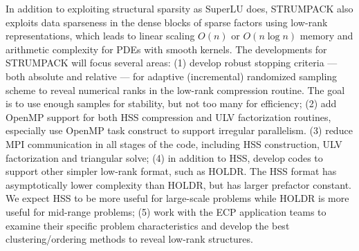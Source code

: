 In addition to exploiting structural sparsity as SuperLU does, STRUMPACK
also exploits data sparseness in the dense blocks of sparse factors using
low-rank representations, which leads to linear scaling $O(n)$ or $O(n \log n)$
memory and arithmetic complexity for PDEs with smooth kernels.
The developments for STRUMPACK will focus several areas:
(1) develop robust stopping criteria --- both absolute and relative --- for
    adaptive (incremental) randomized sampling scheme to reveal numerical
    ranks in the low-rank compression routine. The goal is to use
    enough samples for stability, but not too many for efficiency;
(2) add OpenMP support for both HSS compression and ULV factorization routines,
    especially use OpenMP task construct to support irregular parallelism.
(3) reduce MPI communication in all stages of the code, including HSS
    construction, ULV factorization and triangular solve;
(4) in addition to HSS, develop codes to support other simpler low-rank
    format, such as HOLDR. The HSS format has asymptotically lower complexity
    than HOLDR, but has larger prefactor constant. We expect HSS to be more
    useful for large-scale problems while HOLDR is more useful for mid-range
    problems;
(5) work with the ECP application teams to examine their specific problem
    characteristics and develop the best clustering/ordering methods to 
    reveal low-rank structures.

